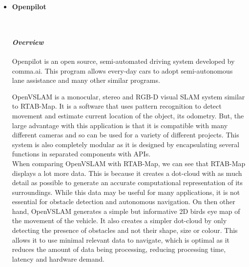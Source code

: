 \documentclass[11pt]{report}
\begin{document}
\begin{itemize}
		\item{\textbf{Openpilot}}
			\\\\
				\begin{frame}{}
				\end{frame}
			\\
			\emph{\textbf{Overview}}
			\\\\
			Openpilot is an open source, semi-automated driving system developed by comma.ai. This program allows every-day cars to adopt semi-autonomous lane assistance and many other similar programs.  
			
			OpenVSLAM is a monocular, stereo and RGB-D visual SLAM system similar to RTAB-Map. It is a software that uses pattern recognition to detect movement and estimate current location of the object, its odometry. But, the  large advantage with this application is that it is compatible with many different cameras and so can be used for a variety of different projects. This system is also completely modular as it is designed by encapsulating several functions in separated components with APIs. \\
	
			When comparing OpenVSLAM with RTAB-Map, we can see that RTAB-Map displays a lot more data. This is because it creates a dot-cloud with as much detail as possible to generate an accurate computational representation of its surroundings. While this data may be useful for many applications, it is not essential for obstacle detection and autonomous navigation. On then other hand, OpenVSLAM generates a simple but informative 2D birds eye map of the movement of the vehicle. It also creates a simpler dot-cloud by only detecting the presence of obstacles and not their shape, size or colour. This allows it to use minimal relevant data to navigate, which is optimal as it reduces the amount of data being processing, reducing processing time, latency and hardware demand. \\
	

\end{itemize}
\end{document}
